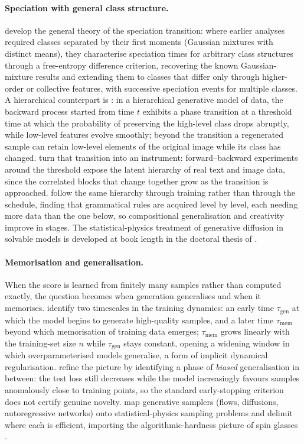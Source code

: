 \paragraph{Speciation with general class structure.}
\citet{achilli2026speciation} develop the general theory of the
speciation transition: where earlier analyses required classes separated
by their first moments (Gaussian mixtures with distinct means), they
characterise speciation times for arbitrary class structures through a
free-entropy difference criterion, recovering the known Gaussian-mixture
results and extending them to classes that differ only through
higher-order or collective features, with successive speciation events
for multiple classes. A hierarchical counterpart is
\citet{sclocchi2025phase}: in a hierarchical generative model of data,
the backward process started from time $t$ exhibits a phase transition at
a threshold time at which the probability of preserving the high-level
class drops abruptly, while low-level features evolve smoothly; beyond
the transition a regenerated sample can retain low-level elements of the
original image while its class has changed. \citet{sclocchi2025probing}
turn that transition into an instrument: forward--backward experiments
around the threshold expose the latent hierarchy of real text and image
data, since the correlated blocks that change together grow as the
transition is approached. \citet{favero2025compositional} follow the same
hierarchy through training rather than through the schedule, finding that
grammatical rules are acquired level by level, each needing more data
than the one below, so compositional generalisation and creativity
improve in stages. The statistical-physics treatment of generative
diffusion in solvable models is developed at book length in the doctoral
thesis of \citet{achilli2026thesis}.

\paragraph{Memorisation and generalisation.} When the score is learned
from finitely many samples rather than computed exactly, the question
becomes when generation generalises and when it memorises.
\citet{bonnaire2025memorize} identify two timescales in the training
dynamics: an early time $\tau_{\mathrm{gen}}$ at which the model begins
to generate high-quality samples, and a later time $\tau_{\mathrm{mem}}$
beyond which memorisation of training data emerges;
$\tau_{\mathrm{mem}}$ grows linearly with the training-set size $n$ while
$\tau_{\mathrm{gen}}$ stays constant, opening a widening window in which
overparameterised models generalise, a form of implicit dynamical
regularisation. \citet{garnierbrun2026biased} refine the picture by
identifying a phase of \emph{biased} generalisation in between: the test
loss still decreases while the model increasingly favours samples
anomalously close to training points, so the standard early-stopping
criterion does not certify genuine novelty. \citet{ghio2024sampling} map
generative samplers (flows, diffusions, autoregressive networks) onto
statistical-physics sampling problems and delimit where each is
efficient, importing the algorithmic-hardness picture of spin glasses
\citep{zdeborova2016statistical}.

